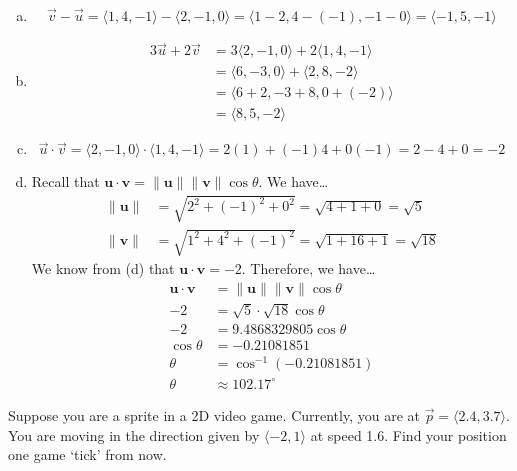 \documentclass[12pt,letterpaper]{exam}
\begin{document}
\begin{questions}
\begin{enumerate}[(a)]
\item 
	\[
	\vec{v} - \vec{u}= \langle 1, 4, -1 \rangle - \langle 2, -1, 0 \rangle= \langle 1 - 2, 4 - (-1), -1 - 0 \rangle= \langle -1, 5, -1 \rangle 
	\] \pspace

\item 
	\[
	\begin{aligned}
	3 \vec{u} + 2 \vec{v}&= 3 \langle 2, -1, 0 \rangle + 2 \langle 1, 4, -1 \rangle \\[0.3cm]
	&= \langle 6, -3, 0 \rangle + \langle 2, 8, -2 \rangle \\[0.3cm]
	&= \langle 6 + 2, -3 + 8, 0 + (-2) \rangle \\[0.3cm]
	&= \langle 8, 5, -2 \rangle 
	\end{aligned}
	\] \pspace

\item 
	\[
	\vec{u} \cdot \vec{v}= \langle 2, -1, 0 \rangle \cdot \langle 1, 4, -1 \rangle= 2(1) + (-1)4 + 0(-1)= 2 - 4 + 0= -2
	\] \pspace

\item Recall that $\mathbf{u} \cdot \mathbf{v}= \| \mathbf{u} \| \| \mathbf{v} \| \cos \theta$. We have\dots
	\[
	\begin{aligned}
	\| \mathbf{u} \|&= \sqrt{2^2 + (-1)^2 + 0^2}= \sqrt{4 + 1 + 0}= \sqrt{5} \\[0.3cm]
	\| \mathbf{v} \|&= \sqrt{1^2 + 4^2 + (-1)^2}= \sqrt{1 + 16 + 1}= \sqrt{18}
	\end{aligned}
	\]
We know from (d) that $\mathbf{u} \cdot \mathbf{v}= -2$. Therefore, we have\dots
	\[
	\begin{aligned}
	\mathbf{u} \cdot \mathbf{v}&= \| \mathbf{u} \| \| \mathbf{v} \| \cos \theta \\[0.1cm]
	-2&= \sqrt{5} \cdot \sqrt{18} \cos \theta \\[0.1cm]
	-2&= 9.4868329805 \cos \theta \\[0.1cm]
	\cos \theta&= -0.21081851 \\[0.1cm]
	\theta&= \cos^{-1}(-0.21081851) \\[0.1cm]
	\theta&\approx 102.17^\circ
	\end{aligned}
	\]
\end{enumerate}



\newpage
\question[10] Suppose you are a sprite in a 2D video game. Currently, you are at $\vec{p}= \langle 2.4, 3.7 \rangle$. You are moving in the direction given by $\langle -2, 1 \rangle$ at speed 1.6. Find your position one game `tick' from now. \pspace


\end{questions}
\end{document}
